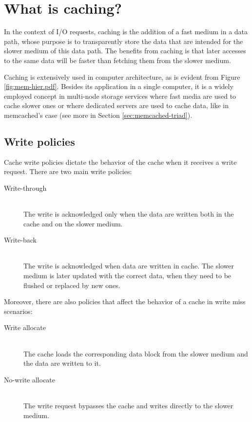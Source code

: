 \section{What is caching?}\label{sec:caching-triad}

In the context of I/O requests, caching is the addition of a fast medium in a 
data path, whose purpose is to transparently store the data that are intended 
for the slower medium of this data path. The benefits from caching is that 
later accesses to the same data will be faster than fetching them from the 
slower medium.

Caching is extensively used in computer architecture, as is evident from Figure 
\ref{fig:mem-hier.pdf}. Besides its application in a single computer, it is a 
widely employed concept in multi-node storage services where fast media are 
used to cache slower ones or where dedicated servers are used to cache data, 
like in memcached's case (see more in Section \ref{sec:memcached-triad}).

\subsection{Write policies}\label{sec:wp-triad}

Cache write policies dictate the behavior of the cache when it receives a write 
request. There are two main write policies:

\begin{description}
	\item[Write-through] \hfill \\
		The write is acknowledged only when the data are written both 
		in the cache and on the slower medium.
	\item[Write-back] \hfill \\
		The write is acknowledged when data are written in cache. The 
		slower medium is later updated with the correct data, when they 
		need to be flushed or replaced by new ones.
\end{description}

Moreover, there are also policies that affect the behavior of a cache in write 
miss scenarios:

\begin{description}
	\item[Write allocate] \hfill \\
		The cache loads the corresponding data block from the slower 
		medium and the data are written to it.
	\item[No-write allocate] \hfill \\
		The write request bypasses the cache and writes directly to the 
		slower medium.
\end{description}

